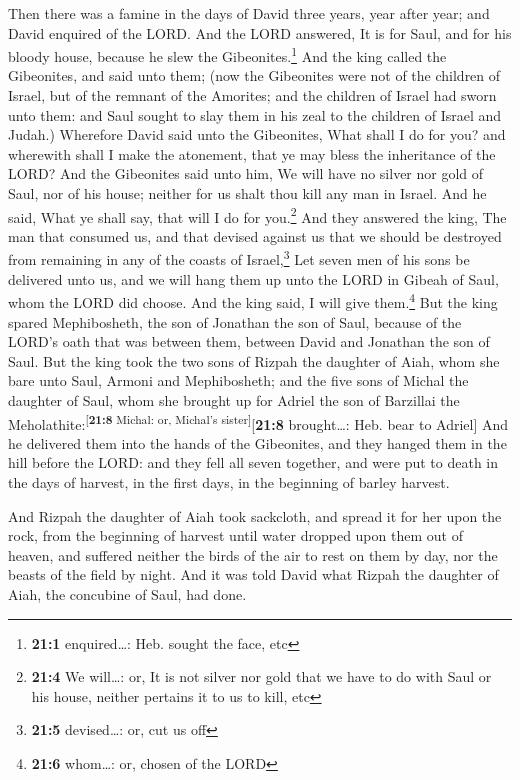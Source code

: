  Then there was a famine in the days of David three years,
year after year; and David enquired of the LORD. And the LORD answered,
It is for Saul, and for his bloody house, because he slew the
Gibeonites.\footnote{\textbf{21:1} enquired\ldots: Heb. sought the face,
  etc}  And the king called the Gibeonites, and said unto
them; (now the Gibeonites were not of the children of Israel, but of the
remnant of the Amorites; and the children of Israel had sworn unto them:
and Saul sought to slay them in his zeal to the children of Israel and
Judah.)  Wherefore David said unto the Gibeonites, What
shall I do for you? and wherewith shall I make the atonement, that ye
may bless the inheritance of the LORD?  And the Gibeonites
said unto him, We will have no silver nor gold of Saul, nor of his
house; neither for us shalt thou kill any man in Israel. And he said,
What ye shall say, that will I do for you.\footnote{\textbf{21:4} We
  will\ldots: or, It is not silver nor gold that we have to do with Saul
  or his house, neither pertains it to us to kill, etc} 
And they answered the king, The man that consumed us, and that devised
against us that we should be destroyed from remaining in any of the
coasts of Israel,\footnote{\textbf{21:5} devised\ldots: or, cut us off}
 Let seven men of his sons be delivered unto us, and we
will hang them up unto the LORD in Gibeah of Saul, whom the LORD did
choose. And the king said, I will give them.\footnote{\textbf{21:6}
  whom\ldots: or, chosen of the LORD}  But the king spared
Mephibosheth, the son of Jonathan the son of Saul, because of the LORD's
oath that was between them, between David and Jonathan the son of Saul.
 But the king took the two sons of Rizpah the daughter of
Aiah, whom she bare unto Saul, Armoni and Mephibosheth; and the five
sons of Michal the daughter of Saul, whom she brought up for Adriel the
son of Barzillai the Meholathite:\textsuperscript{{[}\textbf{21:8}
Michal: or, Michal's sister{]}}{[}\textbf{21:8} brought\ldots: Heb. bear
to Adriel{]}  And he delivered them into the hands of the
Gibeonites, and they hanged them in the hill before the LORD: and they
fell all seven together, and were put to death in the days of harvest,
in the first days, in the beginning of barley harvest.

 And Rizpah the daughter of Aiah took sackcloth, and
spread it for her upon the rock, from the beginning of harvest until
water dropped upon them out of heaven, and suffered neither the birds of
the air to rest on them by day, nor the beasts of the field by night.
 And it was told David what Rizpah the daughter of Aiah,
the concubine of Saul, had done.

